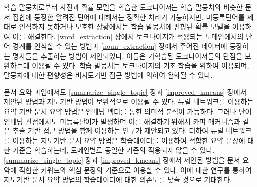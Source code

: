 \documentclass[oneside, ko,phd]{snuthesis_utf8_kor}
\begin{document}
학습 말뭉치로부터 사전과 확률 모델을 학습한 토크나이저는 학습 말뭉치와 비슷한 문서 집합에 등장한 알려진 단어에 대해서는 정확한 처리가 가능하지만, 미등록단어를 제대로 인식하지 못하거나 모호한 상황에서는 학습 말뭉치에 편향된 확률 모델을 이용하여 이를 해결한다.
\ref{word_extraction} 장에서 토크나이저가 적용되는 도메인에서의 단어 경계를 인식할 수 있는 방법과 \ref{noun_extraction} 장에서 주어진 데이터에 등장하는 명사들을 추출하는 방법이 제안되었다.
이들은 기학습된 토크나이저들의 단점을 보완하는데 이용될 수 있다.
학습 말뭉치는 토크나이저의 기초 학습을 위하여 이용되며, 말뭉치에 대한 편향성은 비지도기반 접근 방법에 의하여 완화될 수 있다.

문서 요약 과업에서도 \ref{summarize_single_topic} 장과 \ref{improved_kmeans} 장에서 제안된 방법과 지도기반 방법이 보완적으로 이용될 수 있다.
뉴럴 네트워크를 이용하는 요약 기반 문서 요약 방법은 임베딩 벡터를 통한 의미적 분석이 가능하다.
그러나 단어 임베딩 관점에서도 미등록단어가 발생하며 이를 해결하기 위해서 카피 매커니즘과 같은 추출 기반 접근 방법을 함께 이용하는 연구가 제안되고 있다.
더하여 뉴럴 네트워크를 이용하는 지도기반 문서 요약 방법은 학습데이터를 이용하여 적합한 요약 문장에 대한 기준을 학습하는데, 도메인별로 동일한 기준의 적용되지 않을 수 있다.
\ref{summarize_single_topic} 장과 \ref{improved_kmeans} 장에서 제안된 방법을 문서 요약에 적합한 키워드와 핵심 문장의 기준으로 이용할 수 있다.
이에 대한 연구를 통하여 지도기반 문서 요약 방법의 학습데이터에 대한 의존도를 낮출 것으로 기대한다.


\begin{bibpage}

\nocite{*}
\end{bibpage}
\end{document}
